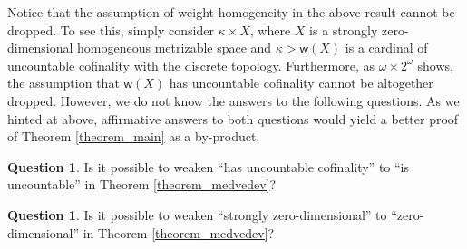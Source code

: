 \documentclass{amsart}
\theoremstyle{plain}
\theoremstyle{definition}
\newtheorem{question}[theorem]{Question}
\newcommand{\weight}{\mathsf{w}}
\begin{document}
Notice that the assumption of weight-homogeneity in the above result cannot be dropped. To see this, simply consider $\kappa\times X$, where $X$ is a strongly zero-dimensional homogeneous metrizable space and $\kappa>\weight(X)$ is a cardinal of uncountable cofinality with the discrete topology. Furthermore, as $\omega\times 2^\omega$ shows, the assumption that $\weight(X)$ has uncountable cofinality cannot be altogether dropped. However, we do not know the answers to the following questions. As we hinted at above, affirmative answers to both questions would yield a better proof of Theorem \ref{theorem_main} as a by-product.
\begin{question}
Is it possible to weaken ``has uncountable cofinality'' to ``is uncountable'' in Theorem \ref{theorem_medvedev}?
\end{question}
\begin{question}
Is it possible to weaken ``strongly zero-dimensional'' to ``zero-dimensional'' in Theorem \ref{theorem_medvedev}?
\end{question}
\end{document}
